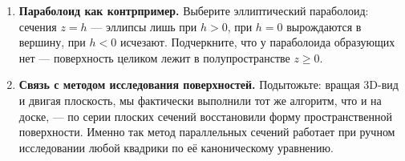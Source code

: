\begin{enumerate}
  \item \textbf{Параболоид как контрпример.} Выберите эллиптический
    параболоид: сечения $z = h$ --- эллипсы лишь при $h > 0$, при
    $h = 0$ вырождаются в вершину, при $h < 0$ исчезают. Подчеркните,
    что у параболоида образующих нет --- поверхность целиком лежит в
    полупространстве $z \ge 0$.

  \item \textbf{Связь с методом исследования поверхностей.}
    Подытожьте: вращая 3D-вид и двигая плоскость, мы фактически
    выполнили тот же алгоритм, что и на доске, --- по серии плоских
    сечений восстановили форму пространственной поверхности. Именно
    так метод параллельных сечений работает при ручном исследовании
    любой квадрики по её каноническому уравнению.
\end{enumerate}
